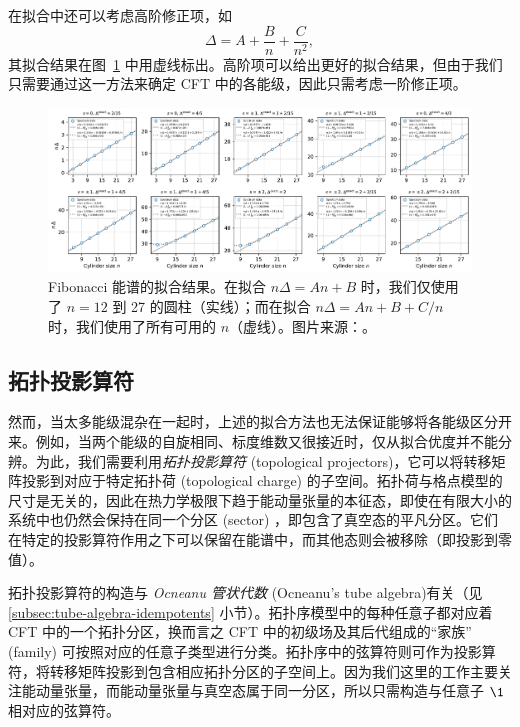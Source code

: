在拟合中还可以考虑高阶修正项，如
\begin{equation}
  \Delta = A + \frac{B}{n} + \frac{C}{n^2},
\end{equation}
其拟合结果在图~\ref{fig:fib-fitting} 中用虚线标出。高阶项可以给出更好的拟合结果，但由于我们只需要通过这一方法来确定 CFT 中的各能级，因此只需考虑一阶修正项。

\begin{figure}[ht]
  \centering
  \includegraphics[width=\textwidth]{images/fibonacci/fib-fitting.pdf}
  \caption[Fibonacci 能谱的拟合结果]{Fibonacci 能谱的拟合结果。在拟合 $n\Delta=An+B$ 时，我们仅使用了 $n=12$ 到 27 的圆柱（实线）；而在拟合 $n\Delta=An+B+C/n$ 时，我们使用了所有可用的 $n$（虚线）。图片来源：\parencite{zeng2023virasoro}。}
  \label{fig:fib-fitting}
\end{figure}

\subsection{拓扑投影算符}
\label{subsec:topological-projectors}

然而，当太多能级混杂在一起时，上述的拟合方法也无法保证能够将各能级区分开来。例如，当两个能级的自旋相同、标度维数又很接近时，仅从拟合优度并不能分辨。为此，我们需要利用\emph{拓扑投影算符} (topological projectors)\cite{bultinck2017anyons,williamson2017symmetry,aasen2020topological}，它可以将转移矩阵投影到对应于特定拓扑荷 (topological charge) 的子空间。拓扑荷与格点模型的尺寸是无关的，因此在热力学极限下趋于能动量张量的本征态，即使在有限大小的系统中也仍然会保持在同一个分区 (sector) ，即包含了真空态的平凡分区。它们在特定的投影算符作用之下可以保留在能谱中，而其他态则会被移除（即投影到零值）。

拓扑投影算符的构造与 \emph{Ocneanu 管状代数} (Ocneanu's tube algebra)\cite{evans1995ocneanu,evans1998quantum}有关（见 \ref{subsec:tube-algebra-idempotents} 小节）。拓扑序模型中的每种任意子都对应着 CFT 中的一个拓扑分区，换而言之 CFT 中的初级场及其后代组成的“家族” (family) 可按照对应的任意子类型进行分类。拓扑序中的弦算符则可作为投影算符，将转移矩阵投影到包含相应拓扑分区的子空间上。因为我们这里的工作主要关注能动量张量，而能动量张量与真空态属于同一分区，所以只需构造与任意子 $\1$ 相对应的弦算符。

